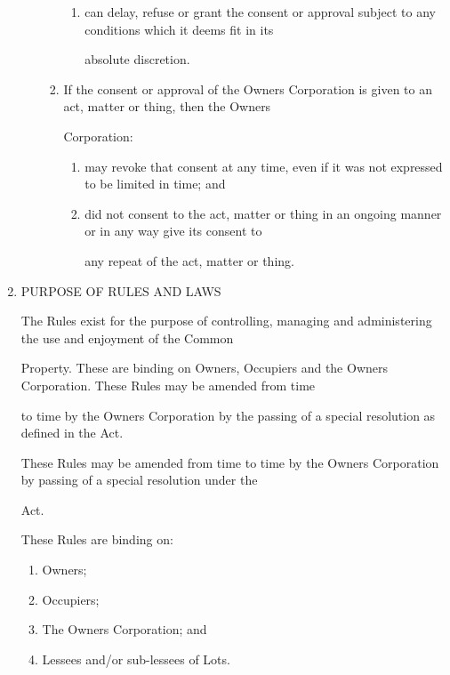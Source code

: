 \documentclass{article}
\begin{document}
\begin{enumerate}[label=\arabic*.]
\begin{enumerate}[label=\arabic{enumi}.\arabic*.]
\begin{enumerate}[label=(\arabic*)]
\begin{enumerate}[label=(\alph*)]
\item  can delay, refuse or grant the consent or approval subject to any conditions which it deems fit in its 

absolute discretion. 

\end{enumerate}
\item  If the consent or approval of the Owners Corporation is given to an act, matter or thing, then the Owners 

Corporation: 

\begin{enumerate}[label=(\alph*)]
\item  may revoke that consent at any time, even if it was not expressed to be limited in time; and 

\item  did not consent to the act, matter or thing in an ongoing manner or in any way give its consent to 

any repeat of the act, matter or thing. 

\end{enumerate}
\end{enumerate}
\end{enumerate}
\item  PURPOSE OF RULES AND LAWS 

The Rules exist for the purpose of controlling, managing and administering the use and enjoyment of the Common 

Property. These are binding on Owners, Occupiers and the Owners Corporation. These Rules may be amended from time 

to time by the Owners Corporation by the passing of a special resolution as defined in the Act. 

These Rules may be amended from time to time by the Owners Corporation by passing of a special resolution under the 

Act. 

These Rules are binding on: 

\begin{enumerate}[label=(\arabic*)]
\item  Owners; 

\item  Occupiers; 

\item  The Owners Corporation; and 

\item  Lessees and/or sub-lessees of Lots. 


\end{enumerate}
\end{enumerate}
\end{document}
